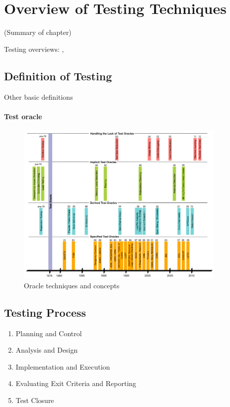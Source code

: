 \chapter{Overview of Testing Techniques}
\label{cha:overview-of-testing}

(Summary of chapter)

Testing overviews: \cite{myers-1979}, \cite{swebok-testing}

\section{Definition of Testing}
\label{sec:definition-of-testing}

Other basic definitions

\subsubsection{Test oracle}

\begin{figure}[ht]
    \centering
    \includegraphics[width=0.9\textwidth]{figures/oracle-survey-techniques}
    \caption{Oracle techniques and concepts \cite{oracle-survey}}
    \label{fig:overview-of-testing:oracle-survey-techniques}
    \end{figure}

\section{Testing Process}
\label{sec:testing-process}

\begin{enumerate}
    \item Planning and Control
    \item Analysis and Design
    \item Implementation and Execution
    \item Evaluating Exit Criteria and Reporting    
    \item Test Closure
\end{enumerate}

